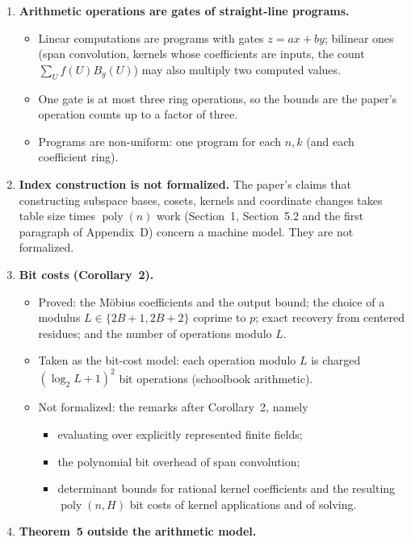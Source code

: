 \documentclass[11pt]{article}
\DeclareMathOperator{\poly}{poly}
\begin{document}
\begin{enumerate}[leftmargin=1.6em]
\item \textbf{Arithmetic operations are gates of straight-line programs.}
  \begin{itemize}
    \item Linear computations are programs with gates $z=ax+by$; bilinear ones (span convolution,
      kernels whose coefficients are inputs, the count $\sum_U f(U)B_g(U)$) may also multiply two
      computed values.
    \item One gate is at most three ring operations, so the bounds are the paper's operation
      counts up to a factor of three.
    \item Programs are non-uniform: one program for each $n,k$ (and each coefficient ring).
  \end{itemize}
\item \textbf{Index construction is not formalized.} The paper's claims that constructing subspace
  bases, cosets, kernels and coordinate changes takes table size times $\poly(n)$ work
  (Section~1, Section~5.2 and the first paragraph of Appendix~D) concern a machine model. They are
  not formalized.
\item \textbf{Bit costs (Corollary~2).}
  \begin{itemize}
    \item Proved: the Möbius coefficients and the output bound; the choice of a modulus
      $L\in\{2B+1,2B+2\}$ coprime to $p$; exact recovery from centered residues; and the number of
      operations modulo $L$.
    \item Taken as the bit-cost model: each operation modulo $L$ is charged $(\log_2 L+1)^2$ bit
      operations (schoolbook arithmetic).
    \item Not formalized: the remarks after Corollary~2, namely
      \begin{itemize}
        \item evaluating over explicitly represented finite fields;
        \item the polynomial bit overhead of span convolution;
        \item determinant bounds for rational kernel coefficients and the resulting
          $\poly(n,H)$ bit costs of kernel applications and of solving.
      \end{itemize}
  \end{itemize}
\item \textbf{Theorem~5 outside the arithmetic model.}
  \begin{itemize}

\end{itemize}
\end{enumerate}
\end{document}

